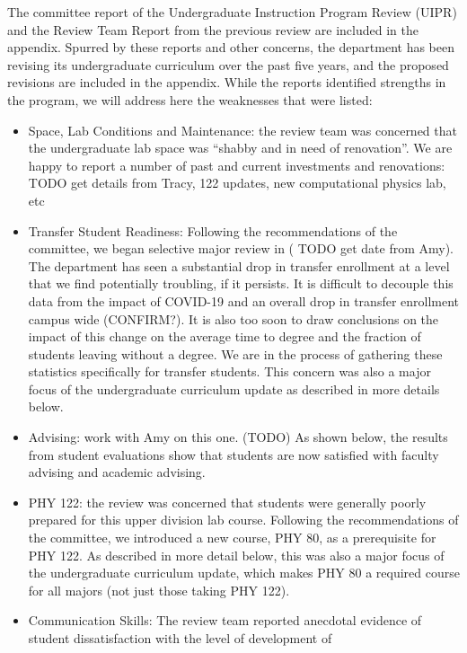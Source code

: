 \documentclass[12pt]{article}
\begin{document}
\noindent
The committee report of the Undergraduate Instruction Program Review
(UIPR) and the Review Team Report from the previous review are
included in the appendix.  Spurred by these reports and other
concerns, the department has been revising its undergraduate curriculum
over the past five years, and the proposed revisions are included in
the appendix. While the reports identified strengths in
the program, we will address here the weaknesses that were listed:
\begin{itemize}
\item Space, Lab Conditions and Maintenance:  the review team was concerned that the undergraduate lab space was ``shabby and in need of renovation''.  We are happy to report a number of past and current investments and renovations:  {\color{red}TODO get details from Tracy, 122 updates, new computational physics lab, etc}
\item Transfer Student Readiness: Following the recommendations of the
  committee, we began selective major review in ({\color{red} TODO get date from
  Amy}).  The department has seen a substantial drop in transfer
  enrollment at a level that we find potentially troubling, if it
  persists.  It is difficult to decouple this data from the impact of COVID-19
  and an overall drop in transfer enrollment campus wide ({\color{red}CONFIRM?}).
  It is also too soon to draw conclusions on the impact of this
  change on the average time to degree and the fraction of students
  leaving without a degree.  We are in the process of gathering these
  statistics specifically for transfer students.  This concern was
  also a major focus of the undergraduate curriculum update as
  described in more details below.
\item {\color{red} Advising:  work with Amy on this one. (TODO)}  As shown below, the results from student evaluations show that students are now satisfied with faculty advising and academic advising.
\item PHY 122: the review was concerned that students were generally
  poorly prepared for this upper division lab course.  Following the
  recommendations of the committee, we introduced a new course, PHY
  80, as a prerequisite for PHY 122.  As described in more detail
  below, this was also a major focus of the undergraduate curriculum
  update, which makes PHY 80 a required course for all majors (not
  just those taking PHY 122).
\item Communication Skills: The review team reported anecdotal
  evidence of student dissatisfaction with the level of development of

\end{itemize}
\end{document}
